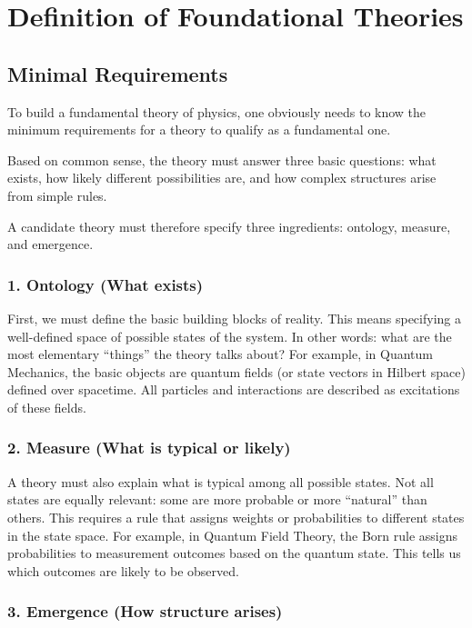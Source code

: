 \chapter{Definition of Foundational Theories}
\label{chap:definition-of-foundational-theories}

\section{Minimal Requirements}

To build a fundamental theory of physics, one obviously needs to know the minimum requirements
for a theory to qualify as a fundamental one.

Based on common sense, the theory must answer three basic questions:
what exists, how likely different possibilities are, and how complex structures arise from simple rules.

A candidate theory must therefore specify three ingredients: ontology, measure, and emergence.

\subsection*{1. Ontology (What exists)}

First, we must define the basic building blocks of reality.
This means specifying a well-defined space of possible states of the system.
In other words: what are the most elementary ``things'' the theory talks about?
For example, in Quantum Mechanics, the basic objects are quantum fields (or state vectors in Hilbert space) defined over spacetime.
All particles and interactions are described as excitations of these fields.

\subsection*{2. Measure (What is typical or likely)}

A theory must also explain what is typical among all possible states.
Not all states are equally relevant: some are more probable or more ``natural'' than others.
This requires a rule that assigns weights or probabilities to different states in the state space.
For example, in Quantum Field Theory, the Born rule assigns probabilities to measurement outcomes
based on the quantum state. This tells us which outcomes are likely to be observed.

\subsection*{3. Emergence (How structure arises)}


